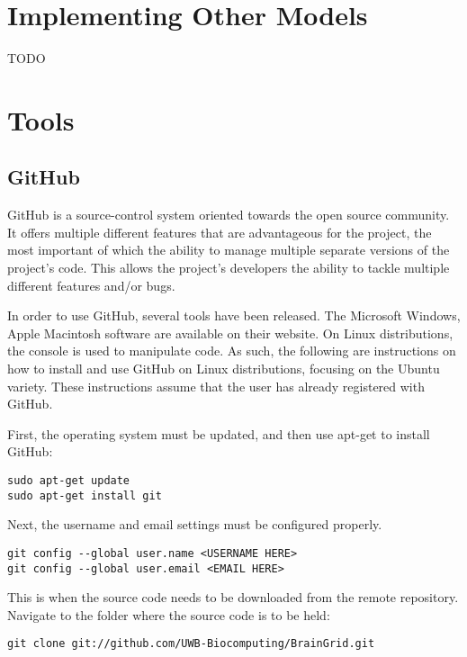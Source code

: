 \documentclass[11pt]{article}
\begin{document}
\section{Implementing Other Models}
TODO
\pagebreak

\section{Tools}
\subsection{GitHub}
\mdseries GitHub is a source-control system oriented towards the open source community. It offers multiple different features that are advantageous for the project, the most important of which the ability to manage multiple separate versions of the project’s code. This allows the project’s developers the ability to tackle multiple different features and/or bugs.

\noindent \mdseries In order to use GitHub, several tools have been released. The Microsoft Windows, Apple Macintosh software are available on their website.  On Linux distributions, the console is used to manipulate code. As such, the following are instructions on how to install and use GitHub on Linux distributions, focusing on the Ubuntu variety. These instructions assume that the user has already registered with GitHub.

\noindent \mdseries First, the operating system must be updated, and then use apt-get to install GitHub:

\begin{verbatim}
sudo apt-get update
sudo apt-get install git
\end{verbatim}

\noindent \mdseries Next, the username and email settings must be configured properly. 
\begin{verbatim}
git config --global user.name <USERNAME HERE>
git config --global user.email <EMAIL HERE>
\end{verbatim}

\noindent This is when the source code needs to be downloaded from the remote repository. Navigate to the folder where the source code is to be held:
\begin{verbatim}
git clone git://github.com/UWB-Biocomputing/BrainGrid.git
\end{verbatim}
\end{document}
